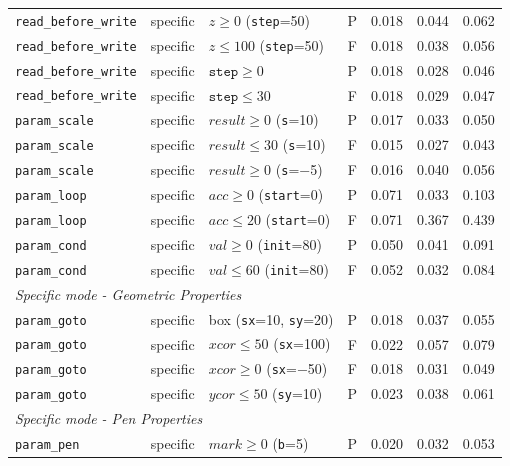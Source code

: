 \begin{longtable}{p{} p{} p{} c r r r}
\midrule
\texttt{read\_before\_write} & specific & $z\geq 0$ (\texttt{step}=50)    & P & 0.018 & 0.044 & 0.062 \\
\texttt{read\_before\_write} & specific & $z\leq 100$ (\texttt{step}=50)  & F & 0.018 & 0.038 & 0.056 \\
\texttt{read\_before\_write} & specific & $\texttt{step}\geq 0$           & P & 0.018 & 0.028 & 0.046 \\
\texttt{read\_before\_write} & specific & $\texttt{step}\leq 30$          & F & 0.018 & 0.029 & 0.047 \\
\texttt{param\_scale}    & specific & $\mathit{result}\geq 0$ (\texttt{s}=10)   & P & 0.017 & 0.033 & 0.050 \\
\texttt{param\_scale}    & specific & $\mathit{result}\leq 30$ (\texttt{s}=10)  & F & 0.015 & 0.027 & 0.043 \\
\texttt{param\_scale}    & specific & $\mathit{result}\geq 0$ (\texttt{s}=$-$5) & F & 0.016 & 0.040 & 0.056 \\
\texttt{param\_loop}     & specific & $\mathit{acc}\geq 0$ (\texttt{start}=0)  & P & 0.071 & 0.033 & 0.103 \\
\texttt{param\_loop}     & specific & $\mathit{acc}\leq 20$ (\texttt{start}=0) & F & 0.071 & 0.367 & 0.439 \\
\texttt{param\_cond}     & specific & $\mathit{val}\geq 0$ (\texttt{init}=80)  & P & 0.050 & 0.041 & 0.091 \\
\texttt{param\_cond}     & specific & $\mathit{val}\leq 60$ (\texttt{init}=80) & F & 0.052 & 0.032 & 0.084 \\
\midrule
\multicolumn{7}{l}{\textit{Specific mode - Geometric Properties}} \\
\midrule
\texttt{param\_goto}     & specific & box (\texttt{sx}=10, \texttt{sy}=20)      & P & 0.018 & 0.037 & 0.055 \\
\texttt{param\_goto}     & specific & $\mathit{xcor}\leq 50$ (\texttt{sx}=100) & F & 0.022 & 0.057 & 0.079 \\
\texttt{param\_goto}     & specific & $\mathit{xcor}\geq 0$ (\texttt{sx}=$-$50) & F & 0.018 & 0.031 & 0.049 \\
\texttt{param\_goto}     & specific & $\mathit{ycor}\leq 50$ (\texttt{sy}=10)  & P & 0.023 & 0.038 & 0.061 \\
\midrule
\multicolumn{7}{l}{\textit{Specific mode - Pen Properties}} \\
\midrule
\texttt{param\_pen}      & specific & $\mathit{mark}\geq 0$ (\texttt{b}=5)    & P & 0.020 & 0.032 & 0.053 \\

\end{longtable}
